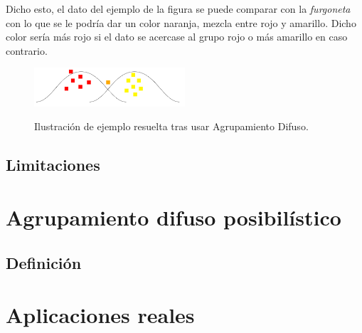 \documentclass[]{report}
\begin{document}
			Dicho esto, el dato del ejemplo de la figura se puede comparar con la \textit{furgoneta} con lo que se le podría dar un color naranja, mezcla entre rojo y amarillo. Dicho color sería más rojo si el dato se acercase al grupo rojo o más amarillo en caso contrario.
			
			\begin{figure}[h]
				\centering
				\includegraphics[width=0.5\textwidth]{clustering_difuso_solucion.jpg}
				\label{clustering_difuso_solucion}
				\caption{Ilustración de ejemplo resuelta tras usar Agrupamiento Difuso.}
			\end{figure}
		
		\section{Limitaciones}
	
	\chapter{Agrupamiento difuso posibilístico}
	
		\section{Definición}
	
	\chapter{Aplicaciones reales}
	


\end{document}

